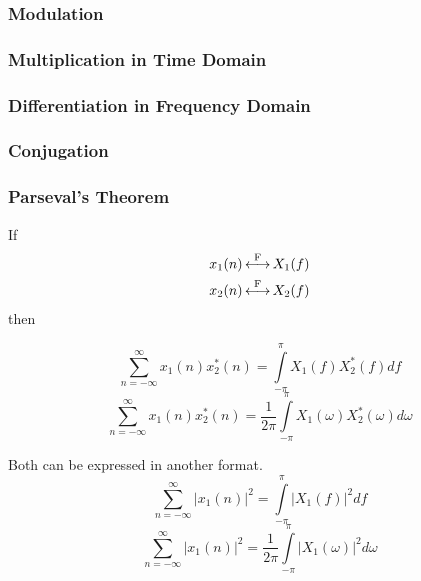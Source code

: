 \subsubsection{Modulation}\label{subsubsec:FourierTransformProperties-Modulation}
\subsubsection{Multiplication in Time Domain}\label{subsubsec:FourierTransformProperties-MultiplicationTimeDomain}
\subsubsection{Differentiation in Frequency Domain}\label{subsubsec:FourierTransformProperties-DifferentiationFrequencyDomain}
\subsubsection{Conjugation}\label{subsubsec:FourierTransformProperties-Conjugation}
\subsubsection{Parseval's Theorem}\label{subsubsec:FourierTransformProperties-ParsevalsTheorem}
If
\begin{equation*}
  \begin{aligned}
    x_{1}(n) &\operatorname{\overset{F}{\longleftrightarrow}} X_{1}(f) \\
    x_{2}(n) &\operatorname{\overset{F}{\longleftrightarrow}} X_{2}(f) \\
  \end{aligned}
\end{equation*}
then

\begin{equation}\label{eq:FourierTransformProperties-ParsevalsTheorem-Frequency}
  \sum\limits_{n=-\infty}^{\infty} x_{1}(n) x_{2}^{*}(n) = \int\limits_{-\pi}^{\pi} X_{1}(f) X_{2}^{*}(f) df
\end{equation}
\begin{equation}\label{eq:FourierTransformProperties-ParsevalsTheorem-Omega}
  \sum\limits_{n=-\infty}^{\infty} x_{1}(n) x_{2}^{*}(n) = \frac{1}{2 \pi} \int\limits_{-\pi}^{\pi} X_{1}(\omega) X_{2}^{*}(\omega) d\omega
\end{equation}

Both  can be expressed in another format.
\begin{equation}\label{eq:FourierTransformProperties-ParsevalsTheorem-Frequency-Absolute}
  \sum\limits_{n=-\infty}^{\infty} \lvert x_{1}(n) \rvert^{2} = \int\limits_{-\pi}^{\pi} \lvert X_{1}(f) \rvert^{2} df
\end{equation}
\begin{equation}\label{eq:FourierTransformProperties-ParsevalsTheorem-Omega-Absolute}
  \sum\limits_{n=-\infty}^{\infty} \lvert x_{1}(n) \rvert^{2} = \frac{1}{2 \pi} \int\limits_{-\pi}^{\pi} \lvert X_{1}(\omega) \rvert^{2} d\omega
\end{equation}
